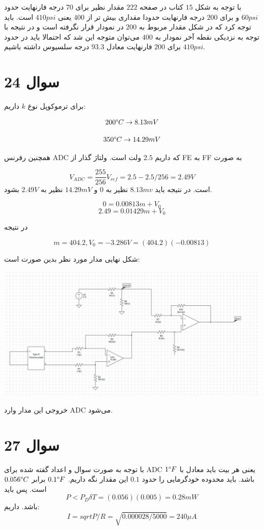 \documentclass[12pt]{article}
\begin{document}
با توجه به شکل $15$ کتاب در صفحه $222$ مقدار نظیر برای $70$ درجه فارنهایت حدود $60psi$ و برای $200$ درجه فارنهایت حدودا مقداری بیش تر از $400$ یعنی $410 psi$ است. باید توجه کرد که در شکل مقدار مربوط به $200$ در نمودار قرار نگرفته است و در نتیجه با توجه به نزدیکی نقطه آخر نمودار به $400$ می‌توان متوجه این شد که احتمالا باید در حدود $410psi$ برای $200$ فارنهایت معادل $93.3$ درجه سلسیوس داشته باشیم.


\newpage
\section{سوال 24}


برای ترموکوپل نوع $k$ داریم:

$$200 \degree C \rightarrow 8.13 mV$$

$$350 \degree C \rightarrow 14.29 mV$$

همچنین رفرنس ADC که داریم $2.5$ ولت است. ولتاژ گذار از FE به FF به صورت

$$V_{ADC} =\frac{255}{256} V_{ref} = 2.5 - 2.5/256 = 2.49 V$$
است. در نتیجه باید $8.13mv$ نظیر به $0$ و $14.29mV$ نظیر به $2.49V$ بشود.


$$0 = 0.00813 m + V_0$$
$$2.49 = 0.01429 m + V_0$$

در نتیجه

$$m = 404.2 , V_0 = -3.286V = (404.2)(-0.00813)$$


شکل نهایی مدار مورد نظر بدین صورت است:


\begin{center}
	\includegraphics[width = 0.5 \textwidth]{images/6.png}
\end{center}



خروجی این مدار وارد ADC می‌شود.

\newpage
\section{سوال 27}

با توجه به صورت سوال و اعداد گفته شده برای ADC یعنی هر بیت باید معادل با $1\degree F$ باشد. باید محدوده خودگرمایی را حدود $0.1$ این مقدار نگه داریم. $0.1\degree F$ برابر $0.056 \degree C$ است. پس باید
$$P<P_D \delta T = (0.056)(0.005) = 0.28 mW$$
باشد. داریم:
$$I = sqrt{P/R} =\sqrt{0.000028/5000} = 240 \mu A$$
\end{document}

